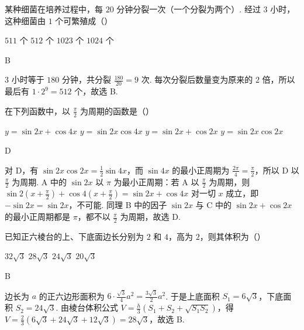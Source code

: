 \documentclass[UTF8,a4paper,oneside,11pt]{ctexbook}
\begin{document}
\begin{problem}
某种细菌在培养过程中，每 \(20\) 分钟分裂一次（一个分裂为两个）. 经过 \(3\) 小时，这种细菌由 \(1\) 个可繁殖成（\quad）

\choices
    {\(511\) 个}
    {\(512\) 个}
    {\(1023\) 个}
    {\(1024\) 个}
\end{problem}

\begin{answer}
B
\end{answer}

\begin{solution}
\(3\) 小时等于 \(180\) 分钟，共分裂 \(\frac{180}{20} = 9\) 次. 每次分裂后数量变为原来的 \(2\) 倍，所以最后有 \(1 \cdot 2^9 = 512\) 个，故选 B.
\end{solution}

\begin{problem}
在下列函数中，以 \(\frac{\pi}{2}\) 为周期的函数是（\quad）

\choices
    {\(y = \sin 2x + \cos 4x\)}
    {\(y = \sin 2x \cos 4x\)}
    {\(y = \sin 2x + \cos 2x\)}
    {\(y = \sin 2x \cos 2x\)}
\end{problem}

\begin{answer}
D
\end{answer}

\begin{solution}
对 D，有 \(\sin 2x \cos 2x = \frac{1}{2}\sin 4x\)，而 \(\sin 4x\) 的最小正周期为 \(\frac{2\pi}{4} = \frac{\pi}{2}\)，所以 D 以 \(\frac{\pi}{2}\) 为周期.
A 中的 \(\sin 2x\) 以 \(\pi\) 为最小正周期：若 A 以 \(\frac{\pi}{2}\) 为周期，则 \(\sin 2\left(x + \frac{\pi}{2}\right) + \cos 4\left(x + \frac{\pi}{2}\right) = \sin 2x + \cos 4x\) 对一切 \(x\) 成立，即 \(-\sin 2x = \sin 2x\)，不可能. 同理 B 中的因子 \(\sin 2x\) 与 C 中的 \(\sin 2x + \cos 2x\) 的最小正周期都是 \(\pi\)，都不以 \(\frac{\pi}{2}\) 为周期，故选 D.
\end{solution}

\begin{problem}
已知正六棱台的上、下底面边长分别为 \(2\) 和 \(4\)，高为 \(2\)，则其体积为（\quad）

\choices
    {\(32\sqrt{3}\)}
    {\(28\sqrt{3}\)}
    {\(24\sqrt{3}\)}
    {\(20\sqrt{3}\)}
\end{problem}

\begin{answer}
B
\end{answer}

\begin{solution}
边长为 \(a\) 的正六边形面积为 \(6 \cdot \frac{\sqrt{3}}{4}a^2 = \frac{3\sqrt{3}}{2}a^2\). 于是上底面积 \(S_1 = 6\sqrt{3}\)，下底面积 \(S_2 = 24\sqrt{3}\). 由棱台体积公式 \(V = \frac{h}{3}\left(S_1 + S_2 + \sqrt{S_1 S_2}\right)\)，得 \(V = \frac{2}{3}\left(6\sqrt{3} + 24\sqrt{3} + 12\sqrt{3}\right) = 28\sqrt{3}\)，故选 B.
\end{solution}
\end{document}
